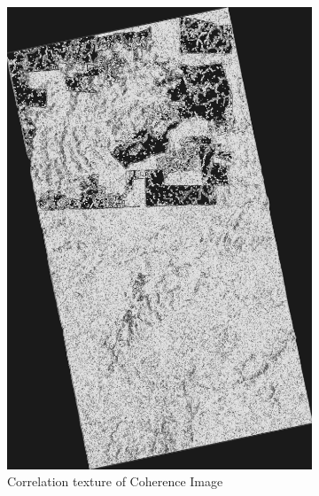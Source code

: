 \begin{figure}[H]
\begin{subfigure}[b]{0.4\linewidth}
    \includegraphics[width=\linewidth]{Chapter4/glcm_textures/correlationimage.png}
    \caption{Correlation texture of Coherence Image}
  \end{subfigure}
  \begin{subfigure}[b]{0.4\linewidth}

\end{subfigure}
\end{figure}

